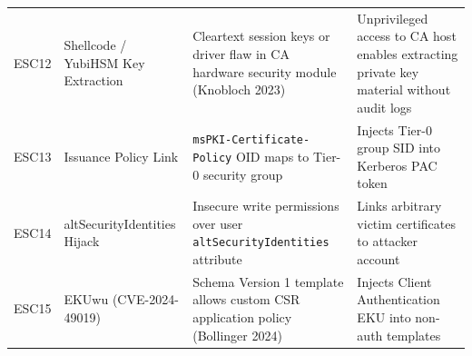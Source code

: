 \begin{table}[ht]
\begin{tabularx}{\textwidth}{l >{\hsize=0.7\hsize\raggedright\arraybackslash}X >{\hsize=1.15\hsize\raggedright\arraybackslash}X >{\hsize=1.15\hsize\raggedright\arraybackslash}X}
ESC12 & Shellcode / YubiHSM Key Extraction & Cleartext session keys or driver flaw in CA hardware security module (Knobloch 2023) & Unprivileged access to CA host enables extracting private key material without audit logs \\
ESC13 & Issuance Policy Link & \texttt{msPKI-Certificate-Policy} OID maps to Tier-0 security group & Injects Tier-0 group SID into Kerberos PAC token \\
ESC14 & altSecurityIdentities Hijack & Insecure write permissions over user \texttt{altSecurityIdentities} attribute & Links arbitrary victim certificates to attacker account \\
ESC15 & EKUwu (CVE-2024-49019) & Schema Version 1 template allows custom CSR application policy (Bollinger 2024) & Injects Client Authentication EKU into non-auth templates \\
\bottomrule
\end{tabularx}
\end{table}

